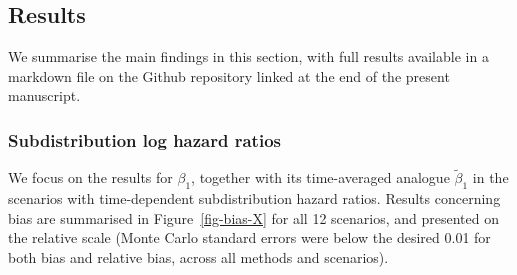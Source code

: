 \documentclass[
  letterpaper,
  paper=240mm:170mm,
  twoside=true,
  open=right,
  fontsize=10pt,
  pagesize=false,
  BCOR=15mm,
  DIV=14,
  headinclude=true,
  footinclude=false,
  headsepline=on]{scrbook}
\begin{document}
\subsection{Results}\label{results-2}

We summarise the main findings in this section, with full results
available in a markdown file on the Github repository linked at the end
of the present manuscript.

\subsubsection{Subdistribution log hazard
ratios}\label{subdistribution-log-hazard-ratios}

We focus on the results for \(\beta_1\), together with its time-averaged
analogue \(\tilde{\beta}_1\) in the scenarios with time-dependent
subdistribution hazard ratios. Results concerning bias are summarised in
Figure~\ref{fig-bias-X} for all 12 scenarios, and presented on the
relative scale (Monte Carlo standard errors were below the desired 0.01
for both bias and relative bias, across all methods and scenarios).
\end{document}
